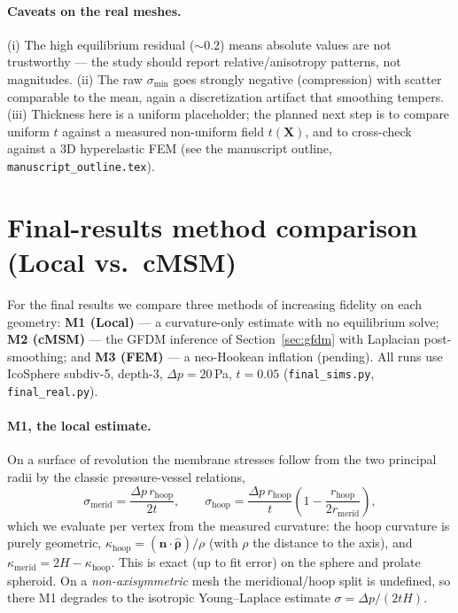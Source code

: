 \documentclass[11pt]{article}
\newcommand{\vv}[1]{\bm{#1}}
\begin{document}
\paragraph{Caveats on the real meshes.} (i) The high equilibrium residual ($\sim0.2$) means
absolute values are not trustworthy --- the study should report relative/anisotropy patterns,
not magnitudes. (ii) The raw $\sigma_{\min}$ goes strongly negative (compression) with
scatter comparable to the mean, again a discretization artifact that smoothing tempers.
(iii) Thickness here is a uniform placeholder; the planned next step is to compare uniform
$t$ against a measured non-uniform field $t(\mathbf X)$, and to cross-check against a 3D
hyperelastic FEM (see the manuscript outline, \texttt{manuscript\_outline.tex}).

\section{Final-results method comparison (Local vs.\ cMSM)}\label{sec:final}

For the final results we compare three methods of increasing fidelity on each geometry:
\textbf{M1 (Local)} --- a curvature-only estimate with no equilibrium solve; \textbf{M2
(cMSM)} --- the GFDM inference of Section~\ref{sec:gfdm} with Laplacian post-smoothing; and
\textbf{M3 (FEM)} --- a neo-Hookean inflation (pending). All runs use IcoSphere subdiv-5,
depth-3, $\Delta p=20$\,Pa, $t=0.05$ (\texttt{final\_sims.py}, \texttt{final\_real.py}).

\paragraph{M1, the local estimate.} On a surface of revolution the membrane stresses follow
from the two principal radii by the classic pressure-vessel relations,
\begin{equation}
  \sigma_{\text{merid}}=\frac{\Delta p\,r_{\text{hoop}}}{2t},\qquad
  \sigma_{\text{hoop}}=\frac{\Delta p\,r_{\text{hoop}}}{t}\!\left(1-\frac{r_{\text{hoop}}}{2r_{\text{merid}}}\right),
\end{equation}
which we evaluate per vertex from the measured curvature: the hoop curvature is purely
geometric, $\kappa_{\text{hoop}}=(\vv n\!\cdot\!\hat{\bm\rho})/\rho$ (with $\rho$ the distance
to the axis), and $\kappa_{\text{merid}}=2H-\kappa_{\text{hoop}}$. This is exact (up to fit
error) on the sphere and prolate spheroid. On a \emph{non-axisymmetric} mesh the
meridional/hoop split is undefined, so there M1 degrades to the isotropic Young--Laplace
estimate $\sigma=\Delta p/(2tH)$.
\end{document}
